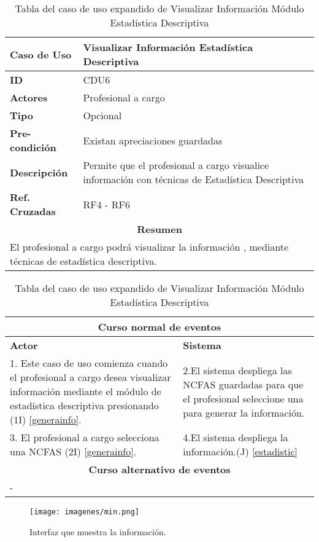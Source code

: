 \begin{table}
	\centering
	\begin{tabular}{|p{6cm} |p{6cm}|}
		\hline \textbf{Caso de Uso} & Visualizar Información Estadística Descriptiva \\ 
		\hline \textbf{ID} & CDU6 \\ 
		\hline \textbf{Actores} & Profesional a cargo \\ 
		\hline \textbf{Tipo} & Opcional \\ 
		\hline \textbf{Pre-condición} & Existan apreciaciones guardadas \\ 
		\hline \textbf{Descripción} & Permite que el profesional a cargo visualice información con técnicas de Estadística Descriptiva \\
		\hline \textbf{Ref. Cruzadas} & RF4 - RF6 \\ 
		\hline
		\multicolumn{2}{|c|}{\textbf{Resumen}} \\
		\hline
		\multicolumn{2}{|p{12cm}|}{El profesional a cargo podrá visualizar la información , mediante técnicas de estadística descriptiva.} \\
		\hline 
	\end{tabular}  
	\begin{tabular}{|p{6cm}|p{6cm}|}
		\multicolumn{2}{|c|}{\textbf{Curso normal de eventos}} \\
		\hline \textbf{Actor} & \textbf{Sistema} \\ 
		\hline 1. Este caso de uso comienza cuando el profesional a cargo desea visualizar información mediante el módulo de estadística descriptiva presionando (1I) \ref{generainfo}. & 2.El sistema despliega las NCFAS guardadas para que el profesional seleccione una para generar la información.  \\ 
		3. El profesional a cargo selecciona una NCFAS (2I) \ref{generainfo}. & 4.El sistema despliega la información.(J) \ref{estadistic}  \\ 
		\hline
		\multicolumn{2}{|c|}{\textbf{Curso alternativo de eventos}} \\
		\hline
		\multicolumn{2}{|p{12cm}|}{ - } \\
		\hline
	\end{tabular}
	\caption{Tabla del caso de uso expandido de Visualizar Información Módulo Estadística Descriptiva}
	\label{tabcdu66}

\end{table}
\clearpage


\begin{figure}[h!]
	\label{min}
	\begin{center}
		\texttt{[image: imagenes/min.png]}
	\end{center}
	\caption{Interfaz que muestra la información.}
\end{figure}

